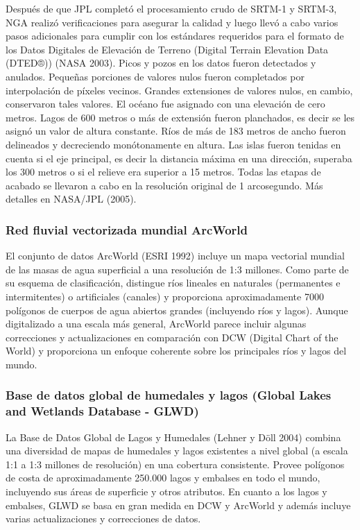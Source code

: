 \documentclass[10pt,a4paper, twoside]{report}
\begin{document}
Después de que JPL completó el procesamiento crudo de SRTM-1 y SRTM-3, NGA realizó verificaciones para asegurar la calidad y luego llevó a cabo varios pasos adicionales para cumplir con los estándares requeridos para el formato de los Datos Digitales de Elevación de Terreno (Digital Terrain Elevation Data (DTED®)) (NASA 2003). Picos y pozos en los datos fueron detectados y anulados. Pequeñas porciones de valores nulos fueron completados por interpolación de píxeles vecinos. Grandes extensiones de valores nulos, en cambio, conservaron tales valores. El océano fue asignado con una elevación de cero metros. Lagos de 600 metros o más de extensión fueron planchados, es decir se les asignó un valor de altura constante. Ríos de más de 183 metros de ancho fueron delineados y decreciendo monótonamente en altura. Las islas fueron tenidas en cuenta si el eje principal, es decir la distancia máxima en una dirección, superaba los 300 metros o si el relieve era superior a 15 metros. Todas las etapas de acabado se llevaron a cabo en la resolución original de 1 arcosegundo. Más detalles en NASA/JPL (2005).

\subsubsection{Red fluvial vectorizada mundial ArcWorld}
\label{ArcWorldLabel}

El conjunto de datos ArcWorld (ESRI 1992) incluye un mapa vectorial mundial de las masas de agua superficial a una resolución de 1:3 millones. Como parte de su esquema de clasificación, distingue ríos lineales en naturales (permanentes e intermitentes) o artificiales (canales) y proporciona aproximadamente 7000 polígonos de cuerpos de agua abiertos grandes (incluyendo ríos y lagos). Aunque digitalizado a una escala más general, ArcWorld parece incluir algunas correcciones y actualizaciones en comparación con DCW (Digital Chart of the World) y proporciona un enfoque coherente sobre los principales ríos y lagos del mundo.

\subsubsection{Base de datos global de humedales y lagos (Global Lakes and Wetlands Database - GLWD)}
\label{GLWDLabel}
La Base de Datos Global de Lagos y Humedales (Lehner y Döll 2004) combina una diversidad de mapas de humedales y lagos existentes a nivel global (a escala 1:1 a 1:3 millones de resolución) en una cobertura consistente. Provee polígonos de costa de aproximadamente 250.000 lagos y embalses en todo el mundo, incluyendo sus áreas de superficie y otros atributos. En cuanto a los lagos y embalses, GLWD se basa en gran medida en DCW y ArcWorld y además incluye varias actualizaciones y correcciones de datos.
\end{document}

